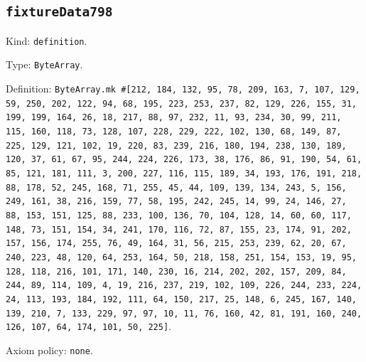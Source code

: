 \documentclass[11pt]{article}
\begin{document}
\subsection*{\texttt{fixtureData798}}
\noindent Kind: \texttt{definition}.\par
\noindent Type: \texttt{ByteArray}.\par
\noindent Definition: \texttt{ByteArray.mk \#[212, 184, 132, 95, 78, 209, 163, 7, 107, 129, 59, 250, 202, 122, 94, 68, 195, 223, 253, 237, 82, 129, 226, 155, 31, 199, 199, 164, 26, 18, 217, 88, 97, 232, 11, 93, 234, 30, 99, 211, 115, 160, 118, 73, 128, 107, 228, 229, 222, 102, 130, 68, 149, 87, 225, 129, 121, 102, 19, 220, 83, 239, 216, 180, 194, 238, 130, 189, 120, 37, 61, 67, 95, 244, 224, 226, 173, 38, 176, 86, 91, 190, 54, 61, 85, 121, 181, 111, 3, 200, 227, 116, 115, 189, 34, 193, 176, 191, 218, 88, 178, 52, 245, 168, 71, 255, 45, 44, 109, 139, 134, 243, 5, 156, 249, 161, 38, 216, 159, 77, 58, 195, 242, 245, 14, 99, 24, 146, 27, 88, 153, 151, 125, 88, 233, 100, 136, 70, 104, 128, 14, 60, 60, 117, 148, 73, 151, 154, 34, 241, 170, 116, 72, 87, 155, 23, 174, 91, 202, 157, 156, 174, 255, 76, 49, 164, 31, 56, 215, 253, 239, 62, 20, 67, 240, 223, 48, 120, 64, 253, 164, 50, 218, 158, 251, 154, 153, 19, 95, 128, 118, 216, 101, 171, 140, 230, 16, 214, 202, 202, 157, 209, 84, 244, 89, 114, 109, 4, 19, 216, 237, 219, 102, 109, 226, 244, 233, 224, 24, 113, 193, 184, 192, 111, 64, 150, 217, 25, 148, 6, 245, 167, 140, 139, 210, 7, 133, 229, 97, 97, 10, 11, 76, 160, 42, 81, 191, 160, 240, 126, 107, 64, 174, 101, 50, 225]}.\par
\noindent Axiom policy: \texttt{none}.\par
\end{document}
